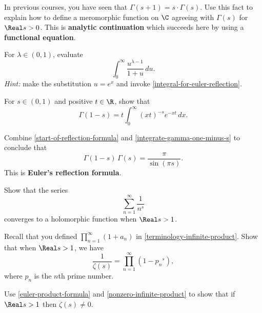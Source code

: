 \documentclass{homework}
\begin{document}
\begin{problem}
  In previous courses, you have seen that
  $\Gamma(s+1) = s \cdot \Gamma(s)$.  Use this fact to explain how to
  define a meromorphic function on $\C$ agreeing with $\Gamma(s)$ for
  $\Real s > 0$.  This is \textbf{analytic continuation} which succeeds
  here by using a \textbf{functional equation}.
\end{problem}

\begin{problem}\label{start-of-reflection-formula}For $\lambda \in (0,1)$, evaluate
  \[
    \int_{0}^\infty \frac{u^{\lambda - 1}}{1 + u} \, du.
  \]
  \textit{Hint:} make the substitution $u = e^x$ and invoke \ref{integral-for-euler-reflection}.
\end{problem}

\begin{problem}\label{integrate-gamma-one-minus-s}For $s \in (0,1)$ and positive $t \in \R$, show that
  \[
    \Gamma(1 - s) = t \int_0^\infty (xt)^{-s} e^{-xt}\, dx.
  \]
\end{problem}

\begin{problem}\label{euler-reflection-formula}Combine \ref{start-of-reflection-formula} and \ref{integrate-gamma-one-minus-s} to conclude that
  \[
    \Gamma(1-s) \, \Gamma(s) = \frac{\pi}{\sin \left( \pi s \right)}.
  \]
  This is \textbf{Euler's reflection formula}.
\end{problem}

\begin{problem}
  Show that the series
  \[\displaystyle\sum_{n=1}^\infty \displaystyle\frac {1}{n^{s}}\]
  converges to a holomorphic function when $\Real s > 1$.
\end{problem}

\begin{problem}\label{euler-product-formula}Recall that you defined
  \(\displaystyle\prod_{n=1}^\infty \left( 1 + a_n \right)\) in
  \ref{terminology-infinite-product}.  Show that when $\Real s > 1$, we
  have
  \[
    \frac{1}{\zeta(s)} = \displaystyle\prod_{n=1}^\infty \left( 1 - {p_n}^s \right),
  \]
  where $p_n$ is the $n$th prime number.
\end{problem}

\begin{problem}
  Use \ref{euler-product-formula} and \ref{nonzero-infinite-product}
  to show that if $\Real s > 1$ then $\zeta(s) \neq 0$.
\end{problem}
\end{document}
